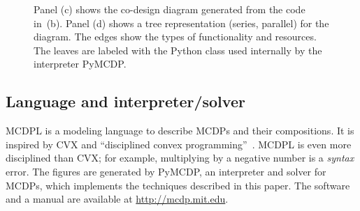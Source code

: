 \begin{figure}
    \begin{centering}
    \end{centering}
    \begin{centering}
        \medskip{}
    \end{centering}
    \begin{centering}
        \medskip{}
        \medskip{}
    \end{centering}
    \begin{centering}
    \end{centering}

    \caption{Panel (c) shows the co-design diagram generated from the code in~(b).
    Panel (d) shows a tree representation (series, parallel) for the diagram.
    The edges show the types of functionality and resources. The leaves
    are labeled with the Python class used internally by the interpreter
    PyMCDP. }
\end{figure}

\subsection{Language and interpreter/solver}

MCDPL is a modeling language to describe MCDPs and their compositions.
It is inspired by CVX and ``disciplined convex programming''~\cite{grant08graph}.
MCDPL is even more disciplined than CVX; for example, multiplying
by a negative number is a \emph{syntax} error. The figures are generated
by PyMCDP, an interpreter and solver for MCDPs, which implements the
techniques described in this paper. The software and a manual are
available at \url{http://mcdp.mit.edu}.

